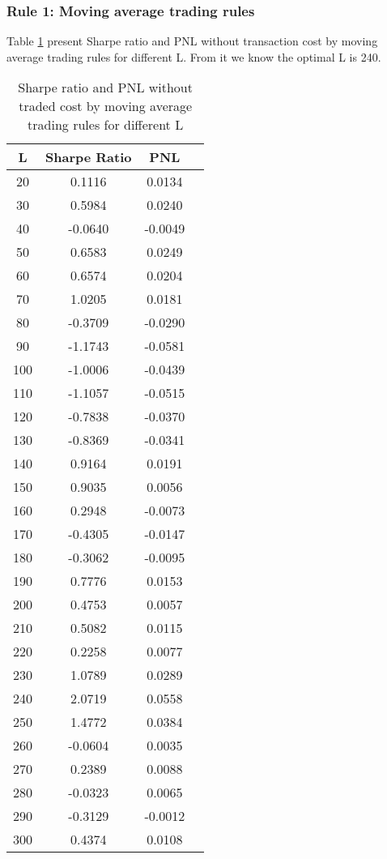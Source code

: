 \documentclass[11pt]{article}
\begin{document}
\subsubsection{Rule 1: Moving average trading rules }
Table \ref{MA_notc} present Sharpe ratio and PNL without transaction cost by moving average trading rules for different L. From it we know the optimal L is 240.
\begin{table}[ht]
\centering
\begin{tabular}{cccc}
  \hline
 L & Sharpe Ratio & PNL \\ 
  \hline
20 & 0.1116 & 0.0134 \\ 
 30 & 0.5984 & 0.0240 \\ 
 40 & -0.0640 & -0.0049 \\ 
 50 & 0.6583 & 0.0249 \\ 
 60 & 0.6574 & 0.0204 \\ 
 70 & 1.0205 & 0.0181 \\ 
 80 & -0.3709 & -0.0290 \\ 
 90 & -1.1743 & -0.0581 \\ 
 100 & -1.0006 & -0.0439 \\ 
 110 & -1.1057 & -0.0515 \\ 
 120 & -0.7838 & -0.0370 \\ 
 130 & -0.8369 & -0.0341 \\ 
  140 & 0.9164 & 0.0191 \\ 
 150 & 0.9035 & 0.0056 \\ 
   160 & 0.2948 & -0.0073 \\ 
   170 & -0.4305 & -0.0147 \\ 
   180 & -0.3062 & -0.0095 \\ 
  190 & 0.7776 & 0.0153 \\ 
 200 & 0.4753 & 0.0057 \\ 
 210 & 0.5082 & 0.0115 \\ 
  220 & 0.2258 & 0.0077 \\ 
 230 & 1.0789 & 0.0289 \\ 
   240 & 2.0719 & 0.0558 \\ 
 250& 1.4772 & 0.0384 \\ 
 260 & -0.0604 & 0.0035 \\ 
   270 & 0.2389 & 0.0088 \\ 
   280 & -0.0323 & 0.0065 \\ 
 290 & -0.3129 & -0.0012 \\ 
 300 & 0.4374 & 0.0108 \\ 
   \hline
\end{tabular}
\caption{Sharpe ratio and PNL without traded cost by moving average trading rules for different L}\label{MA_notc}
\end{table}
\end{document}
